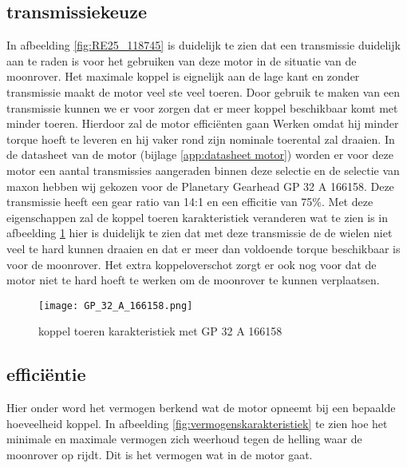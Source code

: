 \subsection{transmissiekeuze}
In afbeelding \ref{fig:RE25_118745} is duidelijk te zien dat een transmissie duidelijk aan te raden is voor het gebruiken van deze motor in de situatie van de moonrover. Het maximale koppel is eignelijk aan de lage kant en zonder transmissie maakt de motor veel ste veel toeren. Door gebruik te maken van een transmissie kunnen we er voor zorgen dat er meer koppel beschikbaar komt met minder toeren. Hierdoor zal de motor efficiënten gaan Werken omdat hij minder torque hoeft te leveren en hij vaker rond zijn nominale toerental zal draaien. In de datasheet van de  motor (bijlage \ref{app:datasheet motor}) worden er voor deze motor een aantal transmissies aangeraden binnen deze selectie en de selectie van maxon hebben wij gekozen voor de Planetary Gearhead GP 32 A 166158. Deze transmissie heeft een gear ratio van 14:1 en een efficitie van 75\%. Met deze eigenschappen zal de koppel toeren karakteristiek veranderen wat te zien is in afbeelding \ref{fig:GP 32 A 166158} hier is duidelijk te zien dat met deze transmissie de de wielen niet veel te hard kunnen draaien en dat er meer dan voldoende torque beschikbaar is voor de moonrover. Het extra koppeloverschot zorgt er ook nog voor dat de motor niet te hard hoeft te werken om de moonrover te kunnen verplaatsen.

        \begin{figure}[H]
                \centering
                \texttt{[image: GP\_32\_A\_166158.png]}
                \caption{koppel toeren karakteristiek met GP 32 A 166158}
                \label{fig:GP 32 A 166158}
        \end{figure}

\subsection{efficiëntie}

Hier onder word het vermogen berkend wat de motor opneemt bij een bepaalde hoeveelheid koppel. In afbeelding \ref{fig:vermogenskarakteristiek} te zien hoe het minimale en maximale vermogen zich weerhoud tegen de helling waar de moonrover op rijdt. Dit is het vermogen wat in de motor gaat.

